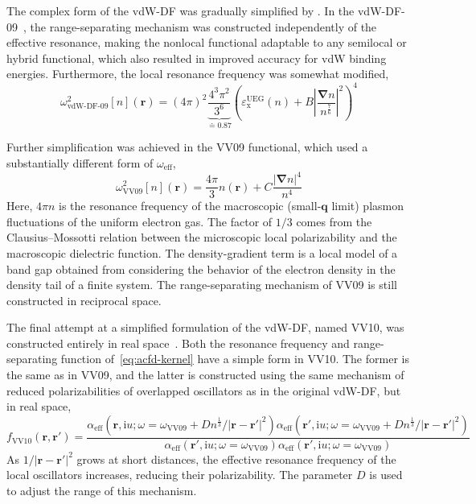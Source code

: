 The complex form of the vdW-DF was gradually simplified by \citeauthor{VydrovJCP09}.
In the vdW-DF-09~\cite{VydrovJCP09}, the range-separating mechanism was constructed independently of the effective resonance, making the nonlocal functional adaptable to any semilocal or hybrid functional, which also resulted in improved accuracy for vdW binding energies.
Furthermore, the local resonance frequency was somewhat modified,
\begin{equation}
  \omega^2_\text{vdW-DF-09}[n](\mathbf r)=(4\pi)^2\underbrace{\frac{4^3\pi^2}{3^6}}_{\doteq 0.87}\left(
      \varepsilon_\text{x}^\text{UEG}(n)
      +B\left\lvert\frac{\mathbf\nabla n}{n^\frac76}\right\rvert^2
      \right)^4
  \label{eq:vdw-df-09}
\end{equation}

Further simplification was achieved in the VV09 functional, which used a substantially different form of $\omega_\text{eff}$,
\begin{equation}
  \omega^2_\text{VV09}[n](\mathbf r)=\frac{4\pi}3n(\mathbf r)+C\frac{|\boldsymbol\nabla n|^4}{n^4}
  \label{eq:vv-pol}
\end{equation}
Here, $4\pi n$ is the resonance frequency of the macroscopic (small-$\mathbf q$ limit) plasmon fluctuations of the uniform electron gas.
The factor of $1/3$ comes from the Clausius--Mossotti relation between the microscopic local polarizability and the macroscopic dielectric function.
The density-gradient term is a local model of a band gap obtained from considering the behavior of the electron density in the density tail of a finite system.
The range-separating mechanism of VV09 is still constructed in reciprocal space.

The final attempt at a simplified formulation of the vdW-DF, named VV10, was constructed entirely in real space~\cite{VydrovJCP10a}.
Both the resonance frequency and range-separating function of~\eqref{eq:acfd-kernel} have a simple form in VV10.
The former is the same as in VV09, and the latter is constructed using the same mechanism of reduced polarizabilities of overlapped oscillators as in the original vdW-DF, but in real space,
\begin{equation}
  f_\text{VV10}(\mathbf r,\mathbf r')=\frac{\alpha_\text{eff}(\mathbf r,\mathrm iu;\omega=\omega_\text{VV09}+Dn^\frac13/|\mathbf r-\mathbf r'|^2)\alpha_\text{eff}(\mathbf r',\mathrm iu;\omega=\omega_\text{VV09}+Dn^\frac13/|\mathbf r-\mathbf r'|^2)}{\alpha_\text{eff}(\mathbf r',\mathrm iu;\omega=\omega_\text{VV09})\alpha_\text{eff}(\mathbf r',\mathrm iu;\omega=\omega_\text{VV09})}
  \label{eq:damping-vv10}
\end{equation}
As $1/|\mathbf r-\mathbf r'|^2$ grows at short distances, the effective resonance frequency of the local oscillators increases, reducing their polarizability.
The parameter $D$ is used to adjust the range of this mechanism.

